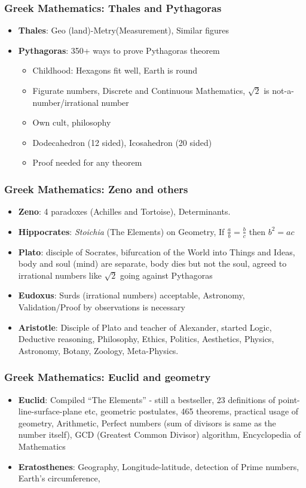 \begin{frame}[fragile]
\frametitle{Greek Mathematics: Thales and Pythagoras}
\begin{itemize}
\item \textbf{Thales}: Geo (land)-Metry(Measurement), Similar figures
\item \textbf{Pythagoras}: 350+ ways to prove Pythagoras theorem
	\begin{itemize}
	\item Childhood: Hexagons fit well, Earth is round
	\item Figurate numbers, Discrete and Continuous Mathematics, $\sqrt{2}$ is not-a-number/irrational number
	\item Own cult, philosophy
	\item Dodecahedron (12 sided), Icosahedron (20 sided)
	\item Proof needed for any theorem
	\end{itemize}
\end{itemize}
\end{frame}

\begin{frame}[fragile]
\frametitle{Greek Mathematics: Zeno and others}
\begin{itemize}
\item \textbf{Zeno}: 4 paradoxes (Achilles and Tortoise), Determinants.
\item \textbf{Hippocrates}: \textit{Stoichia} (The Elements) on Geometry, If $\frac{a}{b} = \frac{b}{c}$ then $b^2 = ac$
\item \textbf{Plato}: disciple of Socrates, bifurcation of the World into Things and Ideas, body and soul (mind) are separate, body dies but not the soul, agreed to irrational numbers like $\sqrt{2}$ going against Pythagoras
\item \textbf{Eudoxus}: Surds (irrational numbers) acceptable, Astronomy, Validation/Proof by observations is necessary
\item \textbf{Aristotle}: Disciple of Plato and teacher of Alexander, started Logic, Deductive reasoning, Philosophy, Ethics, Politics, Aesthetics, Physics, Astronomy, Botany, Zoology, Meta-Physics.
\end{itemize}
\end{frame}

\begin{frame}[fragile]
\frametitle{Greek Mathematics: Euclid and geometry}
\begin{itemize}
\item \textbf{Euclid}: Compiled ``The Elements'' - still a bestseller, 23 definitions of point-line-surface-plane etc,  geometric postulates, 465 theorems, practical usage of geometry, Arithmetic,  Perfect numbers (sum of divisors is same as the number itself),  GCD (Greatest Common Divisor) algorithm, Encyclopedia of Mathematics
\item \textbf{Eratosthenes}: Geography, Longitude-latitude, detection of Prime numbers, Earth's circumference, 
\end{itemize}
\end{frame}


